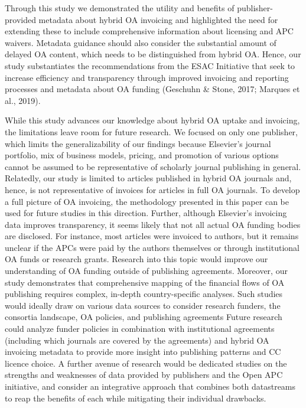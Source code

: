 \documentclass[a4paper,man,floatsintext,longtable,noextraspace,12pt]{apa6}
\begin{document}
Through this study we demonstrated the utility and benefits of
publisher-provided metadata about hybrid OA invoicing and highlighted
the need for extending these to include comprehensive information about
licensing and APC waivers. Metadata guidance should also consider the
substantial amount of delayed OA content, which needs to be
distinguished from hybrid OA. Hence, our study substantiates the
recommendations from the ESAC Initiative that seek to increase
efficiency and transparency through improved invoicing and reporting
processes and metadata about OA funding (Geschuhn \& Stone, 2017;
Marques et al., 2019).

While this study advances our knowledge about hybrid OA uptake and
invoicing, the limitations leave room for future research. We focused on
only one publisher, which limits the generalizability of our findings
because Elsevier's journal portfolio, mix of business models, pricing,
and promotion of various options cannot be assumed to be representative
of scholarly journal publishing in general. Relatedly, our study is
limited to articles published in hybrid OA journals and, hence, is not
representative of invoices for articles in full OA journals. To develop
a full picture of OA invoicing, the methodology presented in this paper
can be used for future studies in this direction. Further, although
Elsevier's invoicing data improves transparency, it seems likely that
not all actual OA funding bodies are disclosed. For instance, most
articles were invoiced to authors, but it remains unclear if the APCs
were paid by the authors themselves or through institutional OA funds or
research grants. Research into this topic would improve our
understanding of OA funding outside of publishing agreements. Moreover,
our study demonstrates that comprehensive mapping of the financial flows
of OA publishing requires complex, in-depth country-specific analyses.
Such studies would ideally draw on various data sources to consider
research funders, the consortia landscape, OA policies, and publishing
agreements Future research could analyze funder policies in combination
with institutional agreements (including which journals are covered by
the agreements) and hybrid OA invoicing metadata to provide more insight
into publishing patterns and CC licence choice. A further avenue of
research would be dedicated studies on the strengths and weaknesses of
data provided by publishers and the Open APC initiative, and consider an
integrative approach that combines both datastreams to reap the benefits
of each while mitigating their individual drawbacks.
\end{document}
